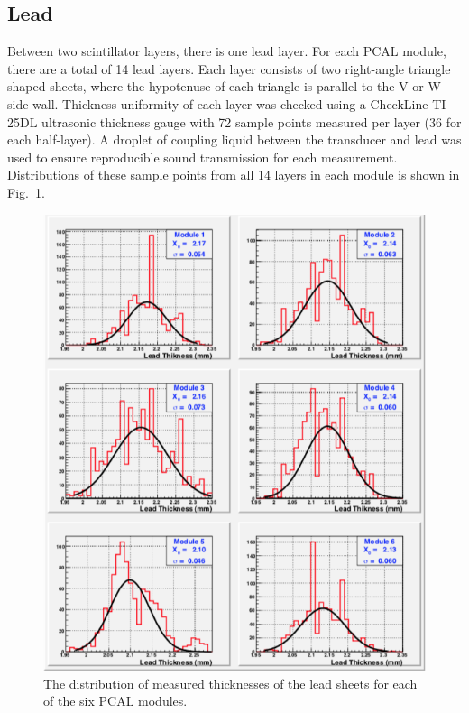 \subsection{Lead}

Between two scintillator layers, there is one lead layer. For each PCAL module, there are a total of 14 lead layers.
Each layer consists of two right-angle triangle shaped sheets, where the hypotenuse of each triangle is parallel to
the V or W side-wall. Thickness uniformity of each layer was checked using a CheckLine TI-25DL ultrasonic
thickness gauge with 72 sample points measured per layer (36 for each half-layer). A droplet of coupling liquid
between the transducer and lead was used to  ensure reproducible sound transmission for each measurement.
Distributions of these sample points from all 14 layers in each module is shown in Fig.~\ref{fig:S4_5}.

\begin{figure}[hbt]
\centering
\includegraphics[width=0.95\columnwidth,keepaspectratio]{img/S4_5.png}
\caption{The distribution of measured thicknesses of the lead sheets for each of the six PCAL modules.}
\label{fig:S4_5}
\end{figure}

